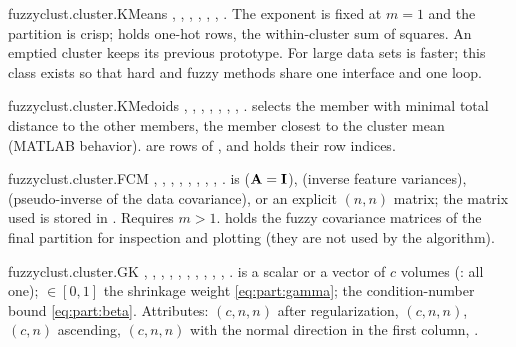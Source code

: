 \begin{apibox}{fuzzyclust.cluster.KMeans}
, , , , , , . The exponent is fixed at $m=1$ and the partition is crisp;  holds one-hot rows,  the within-cluster sum of squares. An emptied cluster keeps its previous prototype. For large data sets  is faster; this class exists so that hard and fuzzy methods share one interface and one loop.
\end{apibox}

\begin{apibox}{fuzzyclust.cluster.KMedoids}
, , , , , , , .  selects the member with minimal total distance to the other members,  the member closest to the cluster mean (MATLAB behavior).  are rows of , and  holds their row indices.
\end{apibox}

\begin{apibox}{fuzzyclust.cluster.FCM}
, , , , , , , , .  is  ($\mathbf{A}=\mathbf{I}$),  (inverse feature variances),  (pseudo-inverse of the data covariance), or an explicit $(n,n)$ matrix; the matrix used is stored in . Requires $m>1$.  holds the fuzzy covariance matrices of the final partition for inspection and plotting (they are not used by the algorithm).
\end{apibox}

\begin{apibox}{fuzzyclust.cluster.GK}
, , , , , , , , , , .  is a scalar or a vector of $c$ volumes (: all one); $\in[0,1]$ the shrinkage weight \eqref{eq:part:gamma};  the condition-number bound \eqref{eq:part:beta}. Attributes:  $(c,n,n)$ after regularization,  $(c,n,n)$,  $(c,n)$ ascending,  $(c,n,n)$ with the normal direction in the first column, .
\end{apibox}

